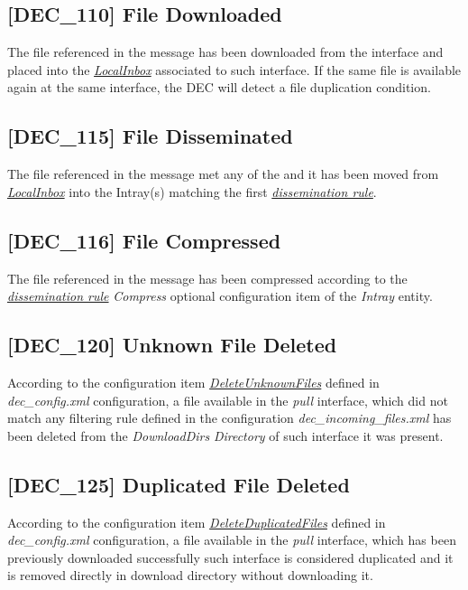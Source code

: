 \documentclass[dec_sum_main.tex]{subfiles}
\begin{document}
\label{DEC110}
\subsection{[DEC\_110] File Downloaded}
The file referenced in the message has been downloaded from the interface and placed into the \hyperref[LocalInbox]{\textit{LocalInbox}} associated to such interface. If the same file is available again at the same interface, the DEC will detect a file duplication condition.

\label{DEC115}
\subsection{[DEC\_115] File Disseminated}
The file referenced in the message met any of the and it has been moved from \hyperref[LocalInbox]{\textit{LocalInbox}} into the Intray(s) matching the first \hyperref[Dissemination rules]{\textit{dissemination rule}}.

\subsection{[DEC\_116] File Compressed}
The file referenced in the message has been compressed according to the \hyperref[Dissemination rules]{\textit{dissemination rule}} \textit{Compress} optional configuration item of the \textit{Intray} entity.

\subsection{[DEC\_120] Unknown File Deleted}
According to the configuration item \hyperref[DeleteUnknownFiles]{\textit{DeleteUnknownFiles}} defined in \textit{dec\_config.xml} configuration, a file available in the \textit{pull} interface, which did not match any filtering rule defined in the configuration \textit{dec\_incoming\_files.xml} has been deleted from the \textit{DownloadDirs} \textit{Directory} of such interface it was present.

\subsection{[DEC\_125] Duplicated File Deleted}
According to the configuration item \hyperref[DeleteDuplicatedFiles]{\textit{DeleteDuplicatedFiles}} defined in \textit{dec\_config.xml} configuration, a file available in the \textit{pull} interface, which has been previously downloaded successfully such interface is considered duplicated and it is removed directly in download directory without downloading it.
\end{document}
